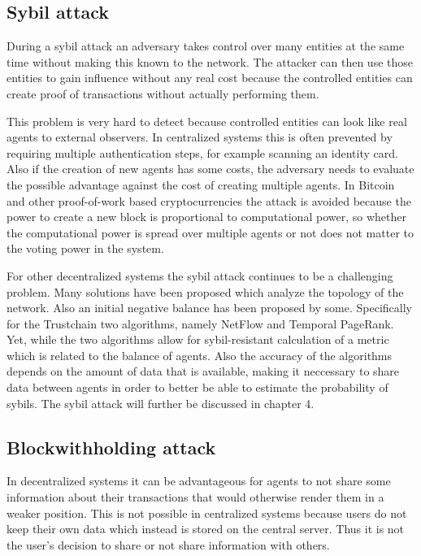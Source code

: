 \subsection{Sybil attack}
During a sybil attack an adversary takes control over many entities at the same time without making
this known to the network. The attacker can then use those entities to gain influence without any
real cost because the controlled entities can create proof of transactions without actually 
performing them.

This problem is very hard to detect because controlled entities can look like real agents to 
external observers. In centralized systems this is often prevented by requiring multiple 
authentication steps, for example scanning an identity card. Also if the creation of new agents has
some costs, the adversary needs to evaluate the possible advantage against the cost of creating
multiple agents.
In Bitcoin and other proof-of-work based cryptocurrencies the attack is avoided because the power
to create a new block is proportional to computational power, so whether the computational power
is spread over multiple agents or not does not matter to the voting power in the system.

For other decentralized systems the sybil attack continues to be a challenging problem. Many 
solutions have been proposed which analyze the topology of the network. Also an initial negative 
balance has been proposed by some. Specifically for the Trustchain two algorithms, namely NetFlow
and Temporal PageRank. Yet, while the two algorithms allow for sybil-resistant calculation of a 
metric which is related to the balance of agents. Also the accuracy of the algorithms depends on 
the amount of data that is available, making it neccessary to share data between agents in order
to better be able to estimate the probability of sybils. The sybil attack will further be discussed
in chapter 4.

\subsection{Blockwithholding attack}
In decentralized systems it can be advantageous for agents to not share some information about
their transactions that would otherwise render them in a weaker position. This is not possible
in centralized systems because users do not keep their own data which instead is stored on the
central server. Thus it is not the user's decision to share or not share information with others.

